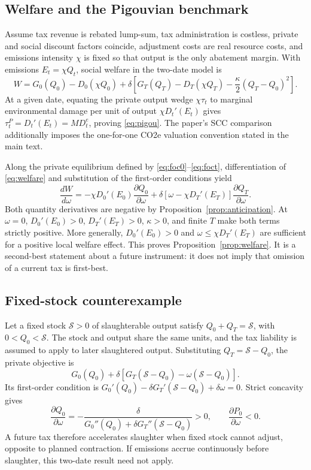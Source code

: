 \documentclass[11pt]{article}
\begin{document}
\subsection{Welfare and the Pigouvian benchmark}
Assume tax revenue is rebated lump-sum, tax administration is costless, private and social discount factors coincide, adjustment costs are real resource costs, and emissions intensity $\chi$ is fixed so that output is the only abatement margin. With emissions $E_t=\chi Q_t$, social welfare in the two-date model is
\begin{equation}\label{eq:welfare}
W=G_0(Q_0)-D_0(\chi Q_0)+\delta\left[G_T(Q_T)-D_T(\chi Q_T)-\frac{\kappa}{2}(Q_T-Q_0)^2\right].
\end{equation}
At a given date, equating the private output wedge $\chi\tau_t$ to marginal environmental damage per unit of output $\chi D_t'(E_t)$ gives $\tau_t^P=D_t'(E_t)=MD_t^e$, proving \eqref{eq:pigou}. The paper's SCC comparison additionally imposes the one-for-one CO2e valuation convention stated in the main text.

Along the private equilibrium defined by \eqref{eq:foc0}--\eqref{eq:foct}, differentiation of \eqref{eq:welfare} and substitution of the first-order conditions yield
\begin{equation}\label{eq:welfare_derivative}
\frac{dW}{d\omega}
=-\chi D_0'(E_0)\frac{\partial Q_0}{\partial\omega}
+\delta[\omega-\chi D_T'(E_T)]\frac{\partial Q_T}{\partial\omega}.
\end{equation}
Both quantity derivatives are negative by Proposition~\ref{prop:anticipation}. At $\omega=0$, $D_0'(E_0)>0$, $D_T'(E_T)>0$, $\kappa>0$, and finite $T$ make both terms strictly positive. More generally, $D_0'(E_0)>0$ and $\omega\leq\chi D_T'(E_T)$ are sufficient for a positive local welfare effect. This proves Proposition~\ref{prop:welfare}. It is a second-best statement about a future instrument: it does not imply that omission of a current tax is first-best.

\subsection{Fixed-stock counterexample}
Let a fixed stock $\mathcal S>0$ of slaughterable output satisfy $Q_0+Q_T=\mathcal S$, with $0<Q_0<\mathcal S$. The stock and output share the same units, and the tax liability is assumed to apply to later slaughtered output. Substituting $Q_T=\mathcal S-Q_0$, the private objective is
\begin{equation*}
G_0(Q_0)+\delta[G_T(\mathcal S-Q_0)-\omega(\mathcal S-Q_0)].
\end{equation*}
Its first-order condition is $G_0'(Q_0)-\delta G_T'(\mathcal S-Q_0)+\delta\omega=0$. Strict concavity gives
\begin{equation*}
\frac{\partial Q_0}{\partial\omega}
=-\frac{\delta}{G_0''(Q_0)+\delta G_T''(\mathcal S-Q_0)}>0,
\qquad
\frac{\partial P_0}{\partial\omega}<0.
\end{equation*}
A future tax therefore accelerates slaughter when fixed stock cannot adjust, opposite to planned contraction. If emissions accrue continuously before slaughter, this two-date result need not apply.
\end{document}
